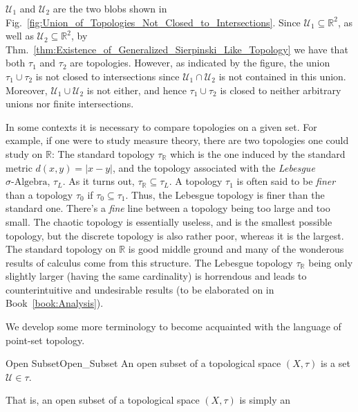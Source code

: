     $\mathcal{U}_{1}$ and $\mathcal{U}_{2}$ are the two blobs shown in
    Fig.~\ref{fig:Union_of_Topologies_Not_Closed_to_Intersections}. Since
    $\mathcal{U}_{1}\subseteq\mathbb{R}^{2}$, as well as
    $\mathcal{U}_{2}\subseteq\mathbb{R}^{2}$, by
    Thm.~\ref{thm:Existence_of_Generalized_Sierpinski_Like_Topology} we have
    that both $\tau_{1}$ and $\tau_{2}$ are topologies. However, as indicated
    by the figure, the union $\tau_{1}\cup\tau_{2}$ is not closed to
    intersections since $\mathcal{U}_{1}\cap\mathcal{U}_{2}$ is not contained in
    this union. Moreover, $\mathcal{U}_{1}\cup\mathcal{U}_{2}$ is not either,
    and hence $\tau_{1}\cup\tau_{2}$ is closed to neither arbitrary unions nor
    finite intersections.
    \par\hfill\par
    In some contexts it is necessary to compare topologies on a given set. For
    example, if one were to study measure theory, there are two topologies one
    could study on $\mathbb{R}$: The standard topology $\tau_{\mathbb{R}}$ which
    is the one induced by the standard metric $d(x,y)=|x-y|$, and the topology
    associated with the \textit{Lebesgue} $\sigma\textrm{-Algebra}$,
    $\tau_{L}$. As it turns out, $\tau_{\mathbb{R}}\subseteq\tau_{L}$. A
    topology $\tau_{1}$ is often said to be \textit{finer} than a topology
    $\tau_{0}$ if $\tau_{0}\subseteq\tau_{1}$. Thus, the Lebesgue topology is
    finer than the standard one. There's a \textit{fine} line between a topology
    being too large and too small. The chaotic topology is essentially useless,
    and is the smallest possible topology, but the discrete topology is also
    rather poor, whereas it is the largest. The standard topology on
    $\mathbb{R}$ is good middle ground and many of the wonderous results of
    calculus come from this structure. The Lebesgue topology $\tau_{\mathbb{R}}$
    being only slightly larger (having the same cardinality) is horrendous and
    leads to counterintuitive and undesirable results (to be elaborated on
    in Book~\ref{book:Analysis}).
    \par\hfill\par
    We develop some more terminology to become acquainted with the language of
    point-set topology.
    \begin{fdefinition}{Open Subset}{Open_Subset}
        An open subset of a \gls{topological space} $(X,\tau)$ is a \gls{set}
        $\mathcal{U}\in\tau$.
    \end{fdefinition}
    That is, an open subset of a topological space $(X,\tau)$ is simply an
